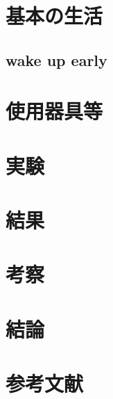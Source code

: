 \documentclass[10pt, a4paper]{jsarticle}
\begin{document}
\tableofcontents %
\newpage

\section{基本の生活}
\subsection{wake up early}


\section{使用器具等}
\section{実験}
\section{結果}
\section{考察}
\section{結論}
\section{参考文献}
\end{document}
